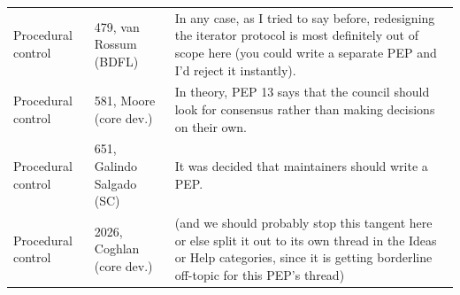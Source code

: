 \begin{table}[t]
\begin{tabular}{p{}p{}p{}}
Procedural control & 479, van Rossum (BDFL) & In any case, as I tried to say before, redesigning the iterator protocol is most definitely out of scope here (you could write a separate PEP and I'd reject it instantly). \\
Procedural control & 581, Moore (core dev.) & In theory, PEP 13 says that the council should look for consensus rather than making decisions on their own. \\
Procedural control & 651, Galindo Salgado (SC) & It was decided that maintainers should write a PEP. \\
Procedural control & 2026, Coghlan (core dev.) & (and we should probably stop this tangent here or else split it out to its own thread in the Ideas or Help categories, since it is getting borderline off-topic for this PEP's thread) \\
\bottomrule
\end{tabular}
\end{table}

